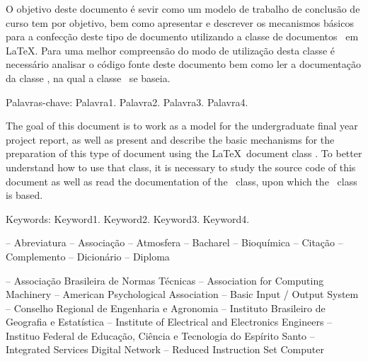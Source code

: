 \documentclass[times,english,brazil,oneside,section=TITLE]{ifes8}
\begin{document}
\begin{resumo}
  O objetivo deste documento é sevir como um modelo de trabalho de
  conclusão de curso tem por objetivo, bem como apresentar e descrever
  os mecanismos básicos para a confecção deste tipo de documento
  utilizando a classe de documentos \ifestex\ em \LaTeX.
  Para uma melhor compreensão do modo de utilização desta classe é
  necessário analisar o código fonte deste documento bem como ler a
  documentação da classe \abnTeX, na qual a classe \ifestex\ se
  baseia.

  Palavras-chave: Palavra1. Palavra2. Palavra3. Palavra4.
\end{resumo}

\begin{resumo}[Abstract]
  \begin{otherlanguage}{english}
    The goal of this document is to work as a model for the
    undergraduate final year project report, as well as present and
    describe the basic mechanisms for the preparation of this type of
    document using the \LaTeX\ document class \ifestex.
    To better understand how to use that class, it is necessary to
    study the source code of this document as well as read the
    documentation of the \abnTeX\ class, upon which the \ifestex\
    class is based.

    Keywords: Keyword1. Keyword2. Keyword3. Keyword4.
  \end{otherlanguage}
\end{resumo}


\renewcommand{\listfigurename}{Lista de figuras}
\pdfbookmark[0]{\listfigurename}{lof}
\listoffigures*
\cleardoublepage


\listoftables*
\cleardoublepage


\listadequadros*
\cleardoublepage


\begin{abreviaturas}
   -- Abreviatura
   -- Associação
   -- Atmosfera
   -- Bacharel
   -- Bioquímica
   -- Citação
   -- Complemento
   -- Dicionário
   -- Diploma
\end{abreviaturas}


\begin{siglas}
   -- Associação Brasileira de Normas Técnicas
   -- Association for Computing Machinery
   -- American Psychological Association
   -- Basic Input / Output System
   -- Conselho Regional de Engenharia e Agronomia
   -- Instituto Brasileiro de Geografia e Estatística
  \simb{IEEE} -- Institute of Electrical and Electronics Engineers
  \simb{Ifes} -- Instituo Federal de Educação, Ciência e Tecnologia do Espírito Santo
  \simb{ISDN} -- Integrated Services Digital Network
   -- Reduced Instruction Set Computer
\end{siglas}
\end{document}
